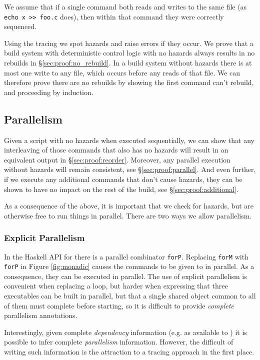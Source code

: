 We assume that if a single command both reads and writes to the same file (as \texttt{echo x >> foo.c} does), then within that command they were correctly sequenced.

Using the tracing we spot hazards and raise errors if they occur. We prove that a build system with deterministic control logic with no hazards always results in no rebuilds in \S\ref{sec:proof:no_rebuild}. In a build system without hazards there is at most one write to any file, which occurs before any reads of that file. We can therefore prove there are no rebuilds by showing the first command can't rebuild, and proceeding by induction.

\subsection{Parallelism}

Given a script with no hazards when executed sequentially, we can show that any interleaving of those commands that also has no hazards will result in an equivalent output in \S\ref{sec:proof:reorder}. Moreover, any parallel execution without hazards will remain consistent, see \S\ref{sec:proof:parallel}. And even further, if we execute any additional commands that don't cause hazards, they can be shown to have no impact on the rest of the build, see \S\ref{sec:proof:additional}.

As a consequence of the above, it is important that we check for hazards, but are otherwise free to run things in parallel. There are two ways we allow parallelism.

\subsubsection{Explicit Parallelism}

In the Haskell API for \Rattle there is a parallel combinator \texttt{forP}. Replacing \texttt{forM} with \texttt{forP} in Figure \ref{fig:monadic} causes the commands to be given to \Rattle in parallel. As a consequence, they can be executed in parallel. The use of explicit parallelism is convenient when replacing a loop, but harder when expressing that three executables can be built in parallel, but that a single shared object common to all of them must complete before starting, so it is difficult to provide \emph{complete} parallelism annotations.

Interestingly, given complete \emph{dependency} information (e.g. as available to \Make) it is possible to infer complete \emph{parallelism} information. However, the difficult of writing such information is the attraction to a tracing approach in the first place.

